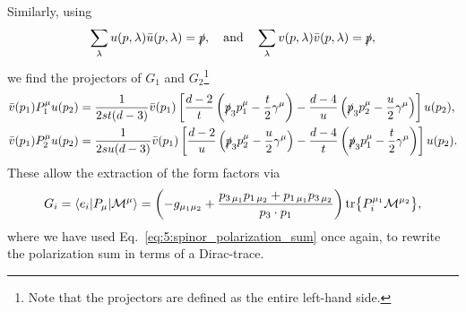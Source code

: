 Similarly, using
\begin{equation}
\sum_{\lambda} u(p, \lambda) \bar{u}(p, \lambda) = \slashed{p}, \quad \text{and} \quad \sum_\lambda v(p, \lambda) \bar{v}(p, \lambda) = \slashed{p},
\label{eq:5:spinor_polarization_sum}
\end{equation}
we find the projectors of $G_1$ and $G_2$\footnote{Note that the projectors are defined as the entire left-hand side.}
\begin{equation}
\begin{split}
\bar{v}(p_1) P_1^\mu u(p_2) &= \frac{1}{2 s t (d - 3)} \bar{v}(p_1) \left[ \frac{d - 2}{t} \left(\slashed{p}_3 p_1^\mu - \frac{t}{2} \gamma^\mu \right) - \frac{d - 4}{u} \left(\slashed{p}_3 p_2^\mu - \frac{u}{2} \gamma^\mu \right) \right]u(p_2), \\
\bar{v}(p_1) P_2^\mu u(p_2) &= \frac{1}{2 s u (d - 3)} \bar{v}(p_1) \left[ \frac{d - 2}{u} \left(\slashed{p}_3 p_2^\mu - \frac{u}{2} \gamma^\mu \right) - \frac{d - 4}{t} \left(\slashed{p}_3 p_1^\mu - \frac{t}{2} \gamma^\mu \right) \right] u(p_2). \\
\end{split}
\end{equation}
These allow the extraction of the form factors via
\begin{equation}
\begin{split}
G_i = \braket{e_i| P_\mu |\mathcal{M}^\mu} =  \left(-g_{\mu_1 \mu_2} + \frac{p_{3\, \mu_1} p_{1\, \mu_2} + p_{1\, \mu_1} p_{3\, \mu_2}}{p_3 \cdot p_1} \right) \text{tr} \big \lbrace P_i^{\mu_1} \mathcal{M}^{\mu_2} \big \rbrace,
\end{split}
\end{equation}
where we have used Eq.~\eqref{eq:5:spinor_polarization_sum} once again, to rewrite the polarization sum in terms of a Dirac-trace.

